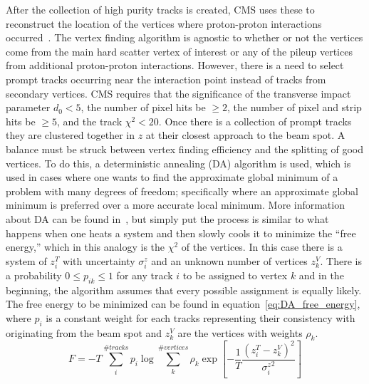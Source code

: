 After the collection of high purity tracks is created, CMS uses these to reconstruct the location of the vertices where proton-proton interactions occurred~\cite{TRK-11-001}.
The vertex finding algorithm is agnostic to whether or not the vertices come from the main hard scatter vertex of interest or any of the pileup vertices from additional proton-proton interactions.
However, there is a need to select prompt tracks occurring near the interaction point instead of tracks from secondary vertices.
CMS requires that the significance of the transverse impact parameter $d_{0}<5$, the number of pixel hits be $\geq2$, the number of pixel and strip hits be $\geq5$, and the track $\chi^{2}<20$.
Once there is a collection of prompt tracks they are clustered together in $z$ at their closest approach to the beam spot.
A balance must be struck between vertex finding efficiency and the splitting of good vertices.
To do this, a deterministic annealing (DA) algorithm is used, which is used in cases where one wants to find the approximate global minimum of a problem with many degrees of freedom; specifically where an approximate global minimum is preferred over a more accurate local minimum.
More information about DA can be found in~\cite{Rose1998}, but simply put the process is similar to what happens when one heats a system and then slowly cools it to minimize the ``free energy,'' which in this analogy is the $\chi^{2}$ of the vertices.
In this case there is a system of $z^{T}_{i}$ with uncertainty $\sigma^{z}_{i}$ and an unknown number of vertices $z^{V}_{k}$.
There is a probability $0\leq{p_{ik}}\leq1$ for any track $i$ to be assigned to vertex $k$ and in the beginning, the algorithm assumes that every possible assignment is equally likely.
The free energy to be minimized can be found in equation~\ref{eq:DA_free_energy}, where $p_{i}$ is a constant weight for each tracks representing their consistency with originating from the beam spot and $z_{k}^{V}$ are the vertices with weights $\rho_{k}$.
\begin{equation}
    \label{eq:DA_free_energy}
    F=-T\sum_{i}^{\#tracks}p_{i}\log\sum_{k}^{\#vertices}\rho_{k}\exp\left[-\frac{1}{T}\frac{\left(z_{i}^{T}-z_{k}^{V}\right)^{2}}{{\sigma_{i}^{z}}^{2}}\right]
\end{equation}

